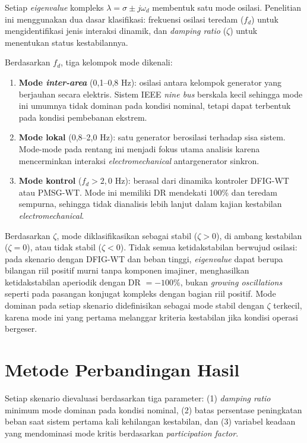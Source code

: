 Setiap \textit{eigenvalue} kompleks $\lambda = \sigma \pm j\omega_d$ membentuk
satu mode osilasi. Penelitian ini menggunakan dua dasar klasifikasi: frekuensi
osilasi teredam ($f_d$) untuk mengidentifikasi jenis interaksi dinamik, dan
\textit{damping ratio} ($\zeta$) untuk menentukan status kestabilannya.

Berdasarkan $f_d$, tiga kelompok mode dikenali:

\begin{enumerate}
    \item \textbf{Mode \textit{inter-area}} (0,1--0,8 Hz): osilasi antara
    kelompok generator yang berjauhan secara elektris. Sistem IEEE \textit{nine
    bus} berskala kecil sehingga mode ini umumnya tidak dominan pada kondisi
    nominal, tetapi dapat terbentuk pada kondisi pembebanan ekstrem.
    \item \textbf{Mode lokal} (0,8--2,0 Hz): satu generator berosilasi terhadap
    sisa sistem. Mode-mode pada rentang ini menjadi fokus utama analisis karena
    mencerminkan interaksi \textit{electromechanical} antargenerator sinkron.
    \item \textbf{Mode kontrol} ($f_d > 2{,}0$ Hz): berasal dari dinamika
    kontroler DFIG-WT atau PMSG-WT. Mode ini memiliki DR mendekati 100\% dan
    teredam sempurna, sehingga tidak dianalisis lebih lanjut dalam kajian
    kestabilan \textit{electromechanical}.
\end{enumerate}

Berdasarkan $\zeta$, mode diklasifikasikan sebagai stabil ($\zeta > 0$), di
ambang kestabilan ($\zeta = 0$), atau tidak stabil ($\zeta < 0$). Tidak semua
ketidakstabilan berwujud osilasi: pada skenario dengan DFIG-WT dan beban
tinggi, \textit{eigenvalue} dapat berupa bilangan riil positif murni tanpa
komponen imajiner, menghasilkan ketidakstabilan aperiodik dengan DR $= -100\%$,
bukan \textit{growing oscillations} seperti pada pasangan konjugat kompleks
dengan bagian riil positif. Mode dominan pada setiap skenario didefinisikan
sebagai mode stabil dengan $\zeta$ terkecil, karena mode ini yang pertama
melanggar kriteria kestabilan jika kondisi operasi bergeser.

\section{Metode Perbandingan Hasil}

Setiap skenario dievaluasi berdasarkan tiga parameter: (1) \textit{damping
ratio} minimum mode dominan pada kondisi nominal, (2) batas persentase
peningkatan beban saat sistem pertama kali kehilangan kestabilan, dan (3)
variabel keadaan yang mendominasi mode kritis berdasarkan \textit{participation
factor}.


